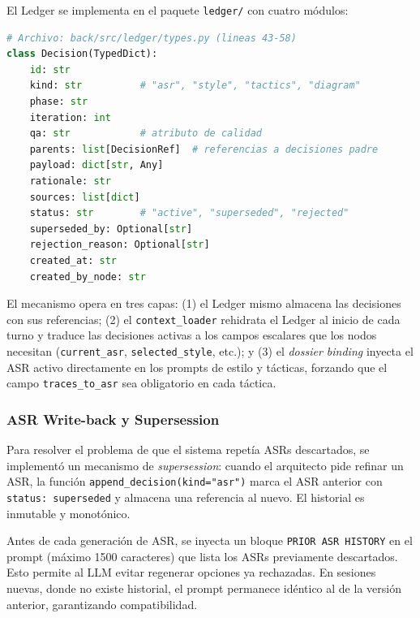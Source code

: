\documentclass[12pt, letterpaper, oneside]{article}
\begin{document}
El Ledger se implementa en el paquete \texttt{ledger/} con cuatro módulos:

\begin{lstlisting}[language=Python,
  caption={Estructura \texttt{Decision} del Design Ledger},
  label={lst:decision-type},
  firstnumber=43]
# Archivo: back/src/ledger/types.py (lineas 43-58)
class Decision(TypedDict):
    id: str
    kind: str          # "asr", "style", "tactics", "diagram"
    phase: str
    iteration: int
    qa: str            # atributo de calidad
    parents: list[DecisionRef]  # referencias a decisiones padre
    payload: dict[str, Any]
    rationale: str
    sources: list[dict]
    status: str        # "active", "superseded", "rejected"
    superseded_by: Optional[str]
    rejection_reason: Optional[str]
    created_at: str
    created_by_node: str
\end{lstlisting}

El mecanismo opera en tres capas: (1) el Ledger mismo almacena las decisiones
con sus referencias; (2) el \texttt{context\_loader} rehidrata el Ledger al
inicio de cada turno y traduce las decisiones activas a los campos escalares que
los nodos necesitan (\texttt{current\_asr}, \texttt{selected\_style}, etc.); y
(3) el \emph{dossier binding} inyecta el ASR activo directamente en los prompts
de estilo y tácticas, forzando que el campo \texttt{traces\_to\_asr} sea
obligatorio en cada táctica.

\subsubsection{ASR Write-back y Supersession}
\label{sssec:supersession}

Para resolver el problema de que el sistema repetía ASRs descartados, se
implementó un mecanismo de \emph{supersession}: cuando el arquitecto pide refinar
un ASR, la función \texttt{append\_decision(kind="asr")} marca el ASR anterior
con \texttt{status: superseded} y almacena una referencia al nuevo. El historial
es inmutable y monotónico.

Antes de cada generación de ASR, se inyecta un bloque \texttt{PRIOR ASR HISTORY}
en el prompt (máximo 1500 caracteres) que lista los ASRs previamente descartados.
Esto permite al LLM evitar regenerar opciones ya rechazadas. En sesiones nuevas,
donde no existe historial, el prompt permanece idéntico al de la versión anterior,
garantizando compatibilidad.


\end{document}
